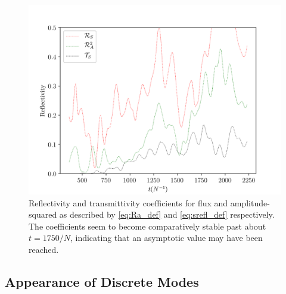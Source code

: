 \documentclass[
        fleqn,
        usenatbib,
    ]{mnras}
\begin{document}
\begin{figure}[t]
    \centering
    \includegraphics[width=\columnwidth]{plots/nl_f_refl.png}
    \caption{Reflectivity and transmittivity coefficients for flux and
    amplitude-squared as described by \autoref{eq:Ra_def} and
    \autoref{eq:srefl_def} respectively. The coefficients seem to become
    comparatively stable past about $t = 1750/N$, indicating that an asymptotic
    value may have been reached.}\label{fig:nl_f_refl}
\end{figure}

\subsection{Appearance of Discrete Modes}\label{ss:modes}
\end{document}
